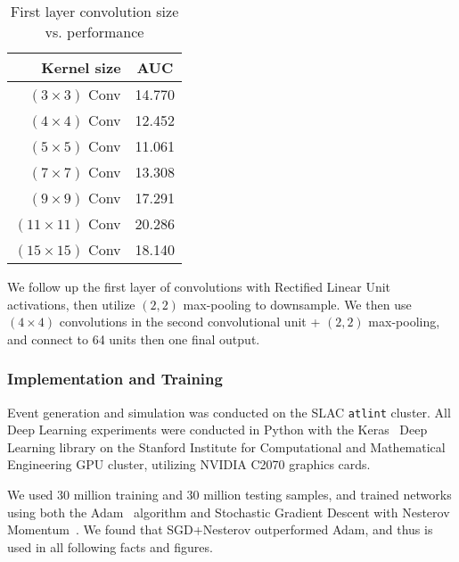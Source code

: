 \begin{table}[h!]
  \centering
  \begin{tabular}{r|c}
    \bfseries Kernel size & \bfseries AUC \\ 
    \hline
    $(3 \times 3)$ Conv & 14.770 \\
    \hline
    $(4 \times 4)$ Conv & 12.452 \\
    \hline
    $(5 \times 5)$ Conv & 11.061 \\
    \hline
    $(7 \times 7)$ Conv & 13.308 \\
    \hline
    $(9 \times 9)$ Conv & 17.291 \\
    \hline
    $(11 \times 11)$ Conv & 20.286 \\
    \hline
    $(15 \times 15)$ Conv & 18.140 \\
  \end{tabular}
  \caption{First layer convolution size vs. performance}
  \label{tab:kernelsize}
\end{table}

We follow up the first layer of convolutions with Rectified Linear Unit activations, then utilize $(2, 2)$ max-pooling to downsample. We then use $(4\times 4)$ convolutions in the second convolutional unit + $(2, 2)$ max-pooling, and connect to 64 units then one final output.

\subsubsection{Implementation and Training} %
\label{ssub:implementation_and_training}


Event generation and simulation was conducted on the SLAC \texttt{atlint} cluster. All Deep Learning experiments were conducted in Python with the Keras~\cite{Keras} Deep Learning library on the Stanford Institute for Computational and Mathematical Engineering GPU cluster, utilizing NVIDIA C2070 graphics cards. 

We used 30 million training and 30 million testing samples, and trained networks using both the Adam~\cite{DBLP:journals/corr/KingmaB14} algorithm and Stochastic Gradient Descent with Nesterov Momentum~\cite{Nesterov:1983wy}. We found that SGD+Nesterov outperformed Adam, and thus is used in all following facts and figures.


